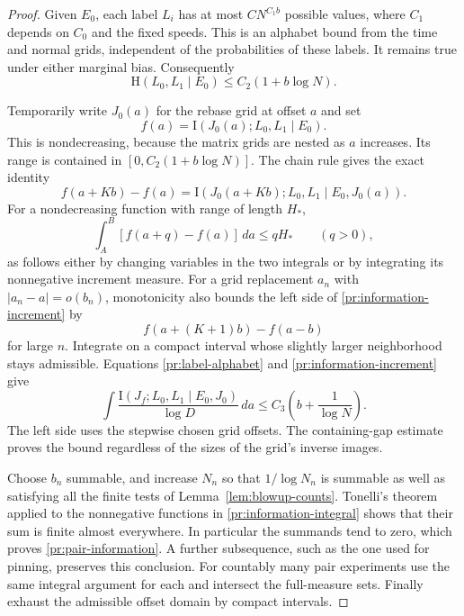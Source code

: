 \begin{proof}
Given $E_0$, each label $L_i$ has at most
$C N^{C_1b}$ possible values, where $C_1$ depends on $C_0$ and
the fixed speeds. This is an alphabet bound from the time and
normal grids, independent of the probabilities of these labels.
It remains true under either marginal bias. Consequently
\begin{equation}
 \mathrm H(L_0,L_1\mid E_0)\le C_2(1+b\log N).
\label{pr:label-alphabet}
\end{equation}

Temporarily write $J_0(a)$ for the rebase grid at offset $a$ and
set
\[
 f(a)=\mathrm I(J_0(a);L_0,L_1\mid E_0).
\]
This is nondecreasing, because the matrix grids are nested as $a$
increases. Its range is contained in
$[0,C_2(1+b\log N)]$. The chain rule gives the exact identity
\begin{equation}
 f(a+Kb)-f(a)
 =\mathrm I(J_0(a+Kb);L_0,L_1\mid E_0,J_0(a)).
\label{pr:information-increment}
\end{equation}
For a nondecreasing function with range of length $H_*$,
\[
 \int_A^B[f(a+q)-f(a)]\,da\le qH_*
 \qquad(q>0),
\]
as follows either by changing variables in the two integrals or
by integrating its nonnegative increment measure.
For a grid replacement $a_n$ with $|a_n-a|=o(b_n)$, monotonicity
also bounds the left side of \eqref{pr:information-increment}
by
\[
 f(a+(K+1)b)-f(a-b)
\]
for large $n$. Integrate on a compact interval whose slightly
larger neighborhood stays admissible. Equations
\eqref{pr:label-alphabet} and \eqref{pr:information-increment}
give
\begin{equation}
 \int
 \frac{\mathrm I(J_f;L_0,L_1\mid E_0,J_0)}{\log D}\,da
 \le C_3\left(b+\frac1{\log N}\right).
\label{pr:information-integral}
\end{equation}
The left side uses the stepwise chosen grid offsets. The
containing-gap estimate proves the bound regardless of the sizes
of the grid's inverse images.

Choose $b_n$ summable, and increase $N_n$ so that
$1/\log N_n$ is summable as well as satisfying all the finite
tests of Lemma~\ref{lem:blowup-counts}. Tonelli's theorem applied
to the nonnegative functions in
\eqref{pr:information-integral} shows that their sum is finite
almost everywhere. In particular the summands tend to zero,
which proves \eqref{pr:pair-information}.
A further subsequence, such as the one used for pinning, preserves
this conclusion. For countably many pair experiments use the same
integral argument for each and intersect the full-measure sets.
Finally exhaust the admissible offset domain by compact intervals.
\end{proof}

